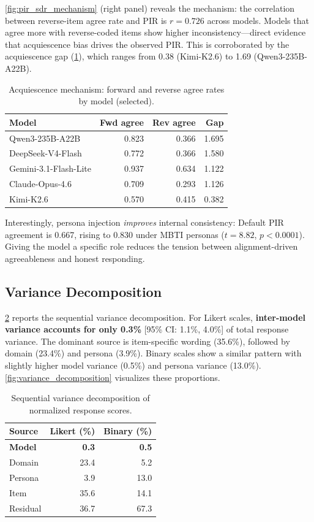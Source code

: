 \documentclass[11pt]{article}
\begin{document}
\cref{fig:pir_sdr_mechanism} (right panel) reveals the mechanism: the correlation between reverse-item agree rate and PIR is $r = 0.726$ across models. Models that agree more with reverse-coded items show higher inconsistency---direct evidence that acquiescence bias drives the observed PIR. This is corroborated by the acquiescence gap (\cref{tab:acq}), which ranges from 0.38 (Kimi-K2.6) to 1.69 (Qwen3-235B-A22B).

\begin{table}[t]
\centering
\caption{Acquiescence mechanism: forward and reverse agree rates by model (selected).}
\label{tab:acq}
\begin{tabular}{lrrr}
\toprule
Model & Fwd agree & Rev agree & Gap \\
\midrule
Qwen3-235B-A22B & 0.823 & 0.366 & 1.695 \\
DeepSeek-V4-Flash & 0.772 & 0.366 & 1.580 \\
Gemini-3.1-Flash-Lite & 0.937 & 0.634 & 1.122 \\
Claude-Opus-4.6 & 0.709 & 0.293 & 1.126 \\
Kimi-K2.6 & 0.570 & 0.415 & 0.382 \\
\bottomrule
\end{tabular}
\end{table}

Interestingly, persona injection \emph{improves} internal consistency: Default PIR agreement is 0.667, rising to 0.830 under MBTI personas ($t = 8.82$, $p < 0.0001$). Giving the model a specific role reduces the tension between alignment-driven agreeableness and honest responding.

\subsection{Variance Decomposition}

\cref{tab:variance} reports the sequential variance decomposition. For Likert scales, \textbf{inter-model variance accounts for only 0.3\%} [95\% CI: 1.1\%, 4.0\%] of total response variance. The dominant source is item-specific wording (35.6\%), followed by domain (23.4\%) and persona (3.9\%). Binary scales show a similar pattern with slightly higher model variance (0.5\%) and persona variance (13.0\%). \cref{fig:variance_decomposition} visualizes these proportions.

\begin{table}[t]
\centering
\caption{Sequential variance decomposition of normalized response scores.}
\label{tab:variance}
\begin{tabular}{lrr}
\toprule
Source & Likert (\%) & Binary (\%) \\
\midrule
\textbf{Model} & \textbf{0.3} & \textbf{0.5} \\
Domain & 23.4 & 5.2 \\
Persona & 3.9 & 13.0 \\
Item & 35.6 & 14.1 \\
Residual & 36.7 & 67.3 \\
\bottomrule
\end{tabular}
\end{table}
\end{document}
